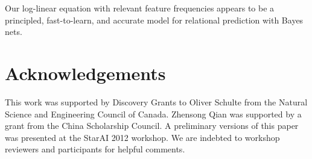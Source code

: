 \documentclass[twoside,11pt]{article}
\begin{document}
Our log-linear equation with relevant feature frequencies appears to be a principled, fast-to-learn, and accurate model for relational prediction with Bayes nets.




\section*{Acknowledgements} This work was supported by Discovery Grants to Oliver Schulte from the Natural Science and Engineering Council of Canada. Zhensong Qian was supported by a grant from the China Scholarship Council. A preliminary versions of this paper was presented at the StarAI 2012 workshop. We are indebted to workshop reviewers and participants for helpful comments.


\end{document}
